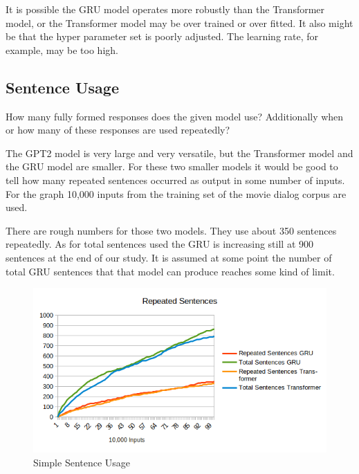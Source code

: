 It is possible the GRU model operates more robustly than the Transformer model, or the Transformer model may be over trained or over fitted. It also might be that the hyper parameter set is poorly adjusted. The learning rate, for example, may be too high.

\subsection{Sentence Usage}

How many fully formed responses does the given model use? Additionally when or how many of these responses are used repeatedly?

The GPT2 model is very large and very versatile, but the Transformer model and the GRU model are smaller. For these two smaller models it would be good to tell how many repeated sentences occurred as output in some number of inputs. For the graph 10,000 inputs from the training set of the movie dialog corpus are used. %

There are rough numbers for those two models. They use about 350 sentences repeatedly. As for total sentences used the GRU is increasing still at 900 sentences at the end of our study. It is assumed at some point the number of total GRU sentences that that model can produce reaches some kind of limit.

\begin{figure}[H]
	\begin{center}
		\includegraphics[scale=0.75]{diagram-output-repeated}
		
		
	\end{center}
	\caption[Simple Sentence Usage]{Simple Sentence Usage}
	
	
\end{figure}


